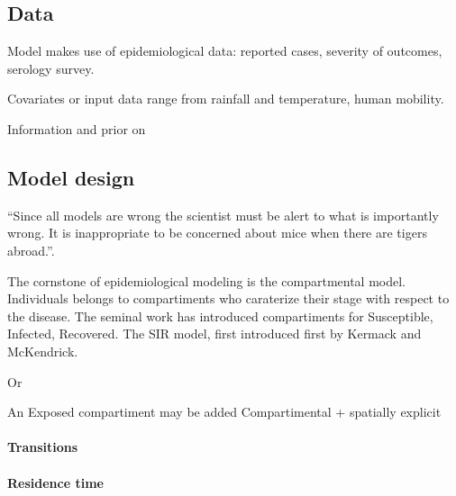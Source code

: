 \subsection{Data}
Model makes use of epidemiological data: reported cases, severity of outcomes, serology survey. 

Covariates or input data range from rainfall and temperature, human mobility.

Information and prior on



\subsection{Model design}

“Since all models are wrong the scientist must be alert to what is importantly wrong. It is inappropriate to be concerned about mice when there are tigers abroad.”\cite{Box:ScienceStatistics:1976}.

The cornstone of epidemiological modeling is the compartmental model. Individuals belongs to compartiments who caraterize their stage with respect to the disease. The seminal work has introduced compartiments for Susceptible, Infected, Recovered. The SIR model, first introduced first by Kermack and McKendrick\cite{Kermack:ContributionMathematicalTheory:1927}. 

Or

An Exposed compartiment may be added 
Compartimental + spatially explicit

\paragraph{Transitions}



\paragraph{Residence time}

\cite{Hurtado:GeneralizationsLinearChain:2019}


